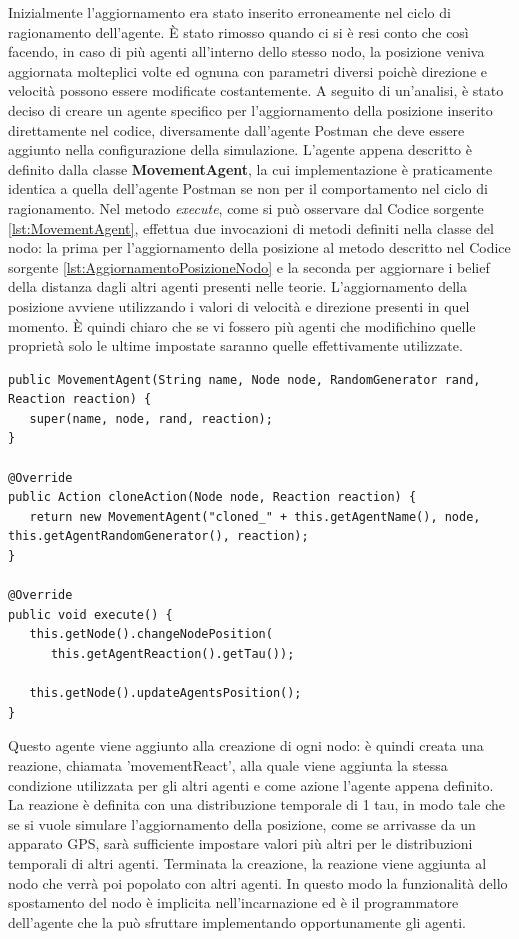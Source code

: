 \documentclass[12pt,a4paper,openright,twoside]{report}
\begin{document}
Inizialmente l'aggiornamento era stato inserito erroneamente nel ciclo di ragionamento dell'agente. \`E stato rimosso quando ci si \`e resi conto che cos\`i facendo, in caso di pi\`u agenti all'interno dello stesso nodo, la posizione veniva aggiornata molteplici volte ed ognuna con parametri diversi poich\`e direzione e velocit\`a possono essere modificate costantemente.
A seguito di un'analisi, \`e stato deciso di creare un agente specifico per l'aggiornamento della posizione inserito direttamente nel codice, diversamente dall'agente Postman che deve essere aggiunto nella configurazione della simulazione.
L'agente appena descritto \`e definito dalla classe \textbf{MovementAgent}, la cui implementazione \`e praticamente identica a quella dell'agente Postman se non per il comportamento nel ciclo di ragionamento.
Nel metodo \textit{execute}, come si pu\`o osservare dal Codice sorgente \ref{lst:MovementAgent}, effettua due invocazioni di metodi definiti nella classe del nodo: la prima per l'aggiornamento della posizione al metodo descritto nel Codice sorgente \ref{lst:AggiornamentoPosizioneNodo} e la seconda per aggiornare i belief della distanza dagli altri agenti presenti nelle teorie.
L'aggiornamento della posizione avviene utilizzando i valori di velocit\`a e direzione presenti in quel momento. \`E quindi chiaro che se vi fossero pi\`u agenti che modifichino quelle propriet\`a solo le ultime impostate saranno quelle effettivamente utilizzate.
\medskip
\begin{lstlisting}[label={lst:MovementAgent},caption={Agente per lo spostamento del nodo}]
public MovementAgent(String name, Node node, RandomGenerator rand, Reaction reaction) {
   super(name, node, rand, reaction);
}

@Override
public Action cloneAction(Node node, Reaction reaction) {
   return new MovementAgent("cloned_" + this.getAgentName(), node, this.getAgentRandomGenerator(), reaction);
}

@Override
public void execute() {
   this.getNode().changeNodePosition(
      this.getAgentReaction().getTau());

   this.getNode().updateAgentsPosition();
}
\end{lstlisting}

Questo agente viene aggiunto alla creazione di ogni nodo: \`e quindi creata una reazione, chiamata 'movementReact', alla quale viene aggiunta la stessa condizione utilizzata per gli altri agenti e come azione l'agente appena definito. La reazione \`e definita con una distribuzione temporale di 1 tau, in modo tale che se si vuole simulare l'aggiornamento della posizione, come se arrivasse da un apparato GPS, sar\`a sufficiente impostare valori pi\`u altri per le distribuzioni temporali di altri agenti.
Terminata la creazione, la reazione viene aggiunta al nodo che verr\`a poi popolato con altri agenti. In questo modo la funzionalit\`a dello spostamento del nodo \`e implicita nell'incarnazione ed \`e il programmatore dell'agente che la pu\`o sfruttare implementando opportunamente gli agenti.
\end{document}
